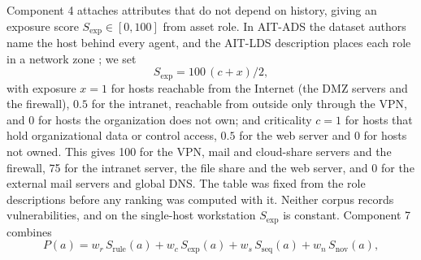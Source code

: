 \documentclass[conference]{IEEEtran}
\begin{document}
Component 4 attaches attributes that do not depend on history, giving an exposure score $S_\mathrm{exp} \in [0,100]$ from asset role. In AIT-ADS the dataset authors name the host behind every agent, and the AIT-LDS description places each role in a network zone \cite{ref22}; we set
\begin{equation}
S_\mathrm{exp} = 100\,(c + x)/2,
\end{equation}
with exposure $x = 1$ for hosts reachable from the Internet (the DMZ servers and the firewall), $0.5$ for the intranet, reachable from outside only through the VPN, and $0$ for hosts the organization does not own; and criticality $c = 1$ for hosts that hold organizational data or control access, $0.5$ for the web server and $0$ for hosts not owned. This gives 100 for the VPN, mail and cloud-share servers and the firewall, 75 for the intranet server, the file share and the web server, and 0 for the external mail servers and global DNS. The table was fixed from the role descriptions before any ranking was computed with it. Neither corpus records vulnerabilities, and on the single-host workstation $S_\mathrm{exp}$ is constant. Component 7 combines
\begin{equation}
P(a) = w_r\, S_\mathrm{rule}(a) + w_c\, S_\mathrm{exp}(a) + w_s\, S_\mathrm{seq}(a) + w_n\, S_\mathrm{nov}(a),
\end{equation}
\end{document}

